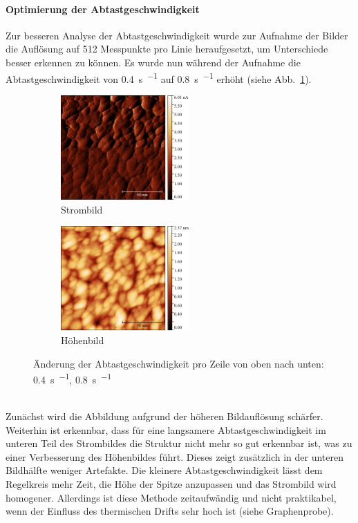 \documentclass[a4paper,twoside,final]{article}
\begin{document}
\paragraph{Optimierung der Abtastgeschwindigkeit}
Zur besseren Analyse der Abtastgeschwindigkeit wurde zur Aufnahme der Bilder die Auflösung auf 512 Messpunkte pro Linie heraufgesetzt, um Unterschiede besser erkennen zu können.
Es wurde nun während der Aufnahme die Abtastgeschwindigkeit von \SI{0.4}{\second\per{}} auf \SI{0.8}{\second\per{}} erhöht (siehe Abb.~\ref{fig:Abtastgeschwindigkeit}).
\begin{figure}[htp]
    \centering
    \begin{subfigure}{0.45\textwidth}
        \includegraphics[height=4cm]{Bilder/Image01982_ppl512_Strom.pdf}
        \caption{Strombild}
    \end{subfigure}
    \hspace{0.5cm}
    \begin{subfigure}{0.45\textwidth}
        \includegraphics[height=4cm]{Bilder/Image01982_ppl512.pdf}
        \caption{Höhenbild}
    \end{subfigure}
    \caption{Änderung der Abtastgeschwindigkeit pro Zeile von oben nach unten: \SI{0,4}{\second\per{}}, \SI{0.8}{\second\per{}}}
    \label{fig:Abtastgeschwindigkeit}
\end{figure}\\
Zunächst wird die Abbildung aufgrund der höheren Bildauflösung schärfer. Weiterhin ist erkennbar, dass für eine langsamere Abtastgeschwindigkeit im unteren Teil des Strombildes die Struktur nicht mehr so gut erkennbar ist, was zu einer Verbesserung des Höhenbildes führt. Dieses zeigt zusätzlich in der unteren Bildhälfte weniger Artefakte. Die kleinere Abtastgeschwindigkeit lässt dem Regelkreis mehr Zeit, die Höhe der Spitze anzupassen und das Strombild wird homogener. Allerdings ist diese Methode zeitaufwändig und nicht praktikabel, wenn der Einfluss des thermischen Drifts sehr hoch ist (siehe Graphenprobe).\\
\end{document}

